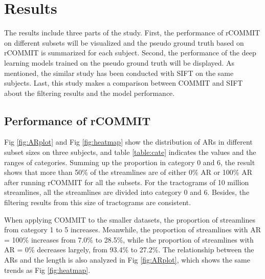 \chapter{Results}

The results include three parts of the study. 
First, the performance of rCOMMIT on different subsets will be visualized and the pseudo ground truth based on 
rCOMMIT is summarized for each subject.
Second, the performance of the deep learning models trained on the pseudo ground truth will be displayed. 
As mentioned, the similar study has been conducted with SIFT \cite{smithSIFTSphericaldeconvolutionInformed2013} on the same subjects.
Last, this study makes a comparison between COMMIT and SIFT about the filtering results and the model performance. 

\section{Performance of rCOMMIT}

Fig \ref{fig:ARplot} and Fig \ref{fig:heatmap} show the distribution of ARs in different subset sizes on three subjects, 
and table \ref{table:cate} indicates the values and the ranges of categories. 
Summing up the proportion in category 0 and 6, the result shows that more than 50\% of the streamlines
are of either 0\% AR or 100\% AR after running rCOMMIT for all the subsets. For the tractograms of 10 million streamlines, all the streamlines
are divided into category 0 and 6. 
Besides, the filtering results from this size of tractograms are consistent.

When applying COMMIT to the smaller datasets, the proportion of streamlines from 
category 1 to 5 increases. Meanwhile, the proportion of streamlines with AR = 100\% increases from 7.0\% to 28.5\%,
while the proportion of streamlines with AR = 0\% decreases largely, from 93.4\% to 27.2\%.
The relationship between the ARs and the length is also analyzed in Fig \ref{fig:ARplot}, which shows the same trends as Fig \ref{fig:heatmap}.


